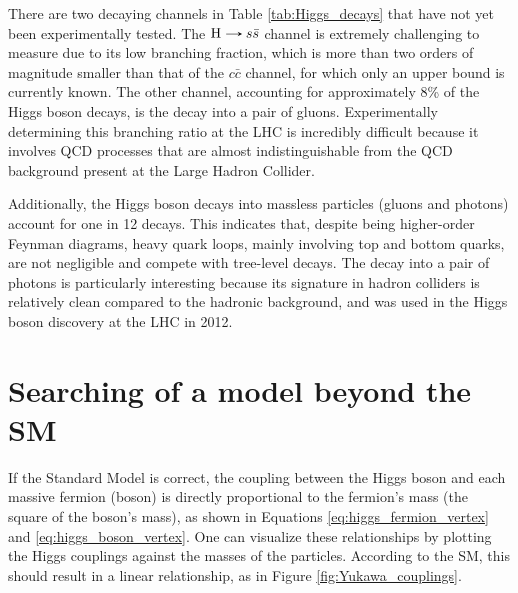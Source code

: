 There are two decaying channels in Table \ref{tab:Higgs_decays} that have not yet been experimentally tested. The $\text{H}\decaysto s\bar{s}$ channel is extremely challenging to measure due to its low branching fraction, which is more than two orders of magnitude smaller than that of the $c\bar{c}$ channel, for which only an upper bound is currently known. The other channel, accounting for approximately 8\% of the Higgs boson decays, is the decay into a pair of gluons. Experimentally determining this branching ratio at the LHC is incredibly difficult because it involves QCD processes that are almost indistinguishable from the QCD background present at the Large Hadron Collider.

Additionally, the Higgs boson decays into massless particles (gluons and photons) account for one in 12 decays. This indicates that, despite being higher-order Feynman diagrams, heavy quark loops, mainly involving top and bottom quarks, are not negligible and compete with tree-level decays. The decay into a pair of photons is particularly interesting because its signature in hadron colliders is relatively clean compared to the hadronic background, and was used in the Higgs boson discovery at the LHC in 2012.

\section{Searching of a model beyond the SM}\label{sec:BSM}

If the Standard Model is correct, the coupling between the Higgs boson and each massive fermion (boson) is directly proportional to the fermion's mass (the square of the boson's mass), as shown in Equations \eqref{eq:higgs_fermion_vertex} and \eqref{eq:higgs_boson_vertex}. One can visualize these relationships by plotting the Higgs couplings against the masses of the particles. According to the SM, this should result in a linear relationship, as in Figure \ref{fig:Yukawa_couplings}.

